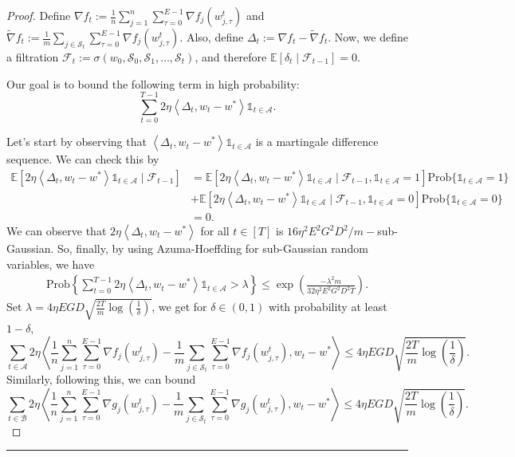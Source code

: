\documentclass{article} %
\DeclareMathOperator{\E}{\E}
\def\E{{\mathbb E}}
\def\A{{\mathcal A}}
\def\B{{\mathcal B}}
\def\S{{\mathcal S}}
\newcommand{\inner}[2]{\left\langle #1, #2 \right\rangle}
\begin{document}
\begin{proof}
    Define $\nabla f_t:= \frac{1}{n}\sum_{j=1}^{n}\sum_{\tau=0}^{E-1}\nabla f_j(w_{j,\tau}^t)$ and $\tilde{\nabla}f_t := \frac{1}{m}\sum_{j\in \S_t}\sum_{\tau=0}^{E-1}\nabla f_j(w_{j,\tau}^t)$. Also, define $\Delta_t:= \nabla f_t - \tilde{\nabla}f_t$. Now, we define a filtration $\mathcal{F}_{t} := \sigma(w_0, \S_0, \S_1,\ldots, \S_t)$, and therefore $\E[\delta_t\mid\mathcal{F}_{t-1}]=0$.

    Our goal is to bound the following term in high probability: $$\sum_{t=0}^{T-1}2\eta\inner{\Delta_t}{w_t-w^*}\mathds{1}_{t\in \A}.$$

    Let's start by observing that $\inner{\Delta_t}{w_t-w^*}\mathds{1}_{t\in \A}$ is a martingale difference sequence. We can check this by
    \begin{align*}
        \E[2\eta\inner{\Delta_t}{w_t-w^*}\mathds{1}_{t\in \A}\mid\mathcal{F}_{t-1}] &= \E[2\eta\inner{\Delta_t}{w_t-w^*}\mathds{1}_{t\in \A}\mid\mathcal{F}_{t-1}, \mathds{1}_{t\in \A}=1] \text{Prob}\{\mathds{1}_{t\in \A}=1\}
        \\
        &+ \E[2\eta\inner{\Delta_t}{w_t-w^*}\mathds{1}_{t\in \A}\mid\mathcal{F}_{t-1},\mathds{1}_{t\in \A}=0]\text{Prob}\{\mathds{1}_{t\in \A}=0\}
        \\
        &=0.
    \end{align*}
    We can observe that $2\eta\inner{\Delta_t}{w_t-w^*}$ for all $t \in [T]$ is $16\eta^2 E^2G^2D^2/m-$sub-Gaussian.
    So, finally, by using Azuma-Hoeffding for sub-Gaussian random variables, we have
    \begin{equation*}
        \begin{aligned}
            \text{Prob}\left\{\sum_{t=0}^{T-1}2\eta\inner{\Delta_t}{w_t-w^*}\mathds{1}_{t\in \A} > \lambda \right\} \leq \exp \left(\frac{-\lambda^2m}{32\eta^2E^2G^2D^2T}\right).
        \end{aligned}
    \end{equation*}
    Set $\lambda = 4\eta EGD\sqrt{\frac{2T}{m}\log(\frac{1}{\delta})}$, we get for $\delta \in (0,1)$ with probability at least $1-\delta$,
    \begin{equation}
        \label{eq:prob_inner_final_obj}
        \sum_{t \in \A} 2\eta\inner{\frac{1}{n}\sum_{j=1}^{n}\sum_{\tau=0}^{E-1}\nabla f_j(w_{j,\tau}^t) - \frac{1}{m}\sum_{j\in \S_t}\sum_{\tau=0}^{E-1}\nabla f_j(w_{j,\tau}^t)}{w_t-w^*} \leq 4\eta EGD\sqrt{\frac{2T}{m}\log(\frac{1}{\delta})}.
    \end{equation} 
    Similarly, following this, we can bound 
    \begin{equation}
        \label{eq:prob_inner_final_constraint}
        \sum_{t\in \B} 2\eta\inner{\frac{1}{n}\sum_{j=1}^{n}\sum_{\tau=0}^{E-1}\nabla g_j(w_{j,\tau}^t) - \frac{1}{m}\sum_{j\in \S_t}\sum_{\tau=0}^{E-1}\nabla g_j(w_{j,\tau}^t)}{w_t-w^*} \leq 4\eta EGD\sqrt{\frac{2T}{m}\log(\frac{1}{\delta})}.
    \end{equation}
\end{proof}
\hrule
\end{document}
